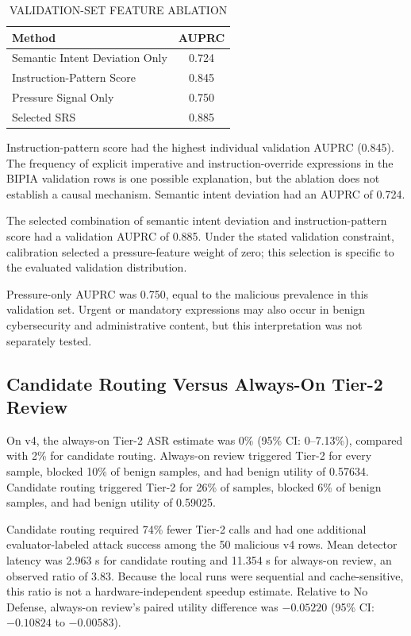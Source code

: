 \documentclass[conference,a4paper]{IEEEtran}
\begin{document}
\begin{table}[t]
\caption{VALIDATION-SET FEATURE ABLATION}
\label{tab:ablation}
\centering
\begin{tabular}{lc}
\toprule
Method & AUPRC \\
\midrule
Semantic Intent Deviation Only & 0.724 \\
Instruction-Pattern Score & 0.845 \\
Pressure Signal Only & 0.750 \\
Selected SRS & 0.885 \\
\bottomrule
\end{tabular}
\end{table}

Instruction-pattern score had the highest individual validation AUPRC (0.845). The frequency of explicit imperative and instruction-override expressions in the BIPIA validation rows is one possible explanation, but the ablation does not establish a causal mechanism. Semantic intent deviation had an AUPRC of 0.724.

The selected combination of semantic intent deviation and instruction-pattern score had a validation AUPRC of 0.885. Under the stated validation constraint, calibration selected a pressure-feature weight of zero; this selection is specific to the evaluated validation distribution.

Pressure-only AUPRC was 0.750, equal to the malicious prevalence in this validation set. Urgent or mandatory expressions may also occur in benign cybersecurity and administrative content, but this interpretation was not separately tested.

\subsection{Candidate Routing Versus Always-On Tier-2 Review}
On v4, the always-on Tier-2 ASR estimate was 0\% (95\% CI: 0--7.13\%), compared with 2\% for candidate routing. Always-on review triggered Tier-2 for every sample, blocked 10\% of benign samples, and had benign utility of 0.57634. Candidate routing triggered Tier-2 for 26\% of samples, blocked 6\% of benign samples, and had benign utility of 0.59025.

Candidate routing required 74\% fewer Tier-2 calls and had one additional evaluator-labeled attack success among the 50 malicious v4 rows. Mean detector latency was 2.963 s for candidate routing and 11.354 s for always-on review, an observed ratio of 3.83. Because the local runs were sequential and cache-sensitive, this ratio is not a hardware-independent speedup estimate. Relative to No Defense, always-on review's paired utility difference was $-0.05220$ (95\% CI: $-0.10824$ to $-0.00583$).
\end{document}

